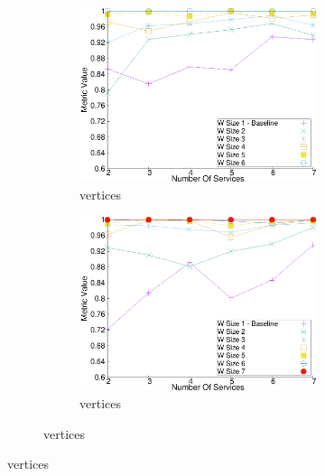 \begin{figure}[H]
\begin{adjustbox}{minipage=\linewidth,scale=0.75}
\begin{subfigure}{0.45\textwidth}
          \begin{subfigure}{\textwidth}
            \includegraphics[width=\textwidth]{Images/graphs/window_quality_performance_diff_perce_n7_s7_50_89_n6}
            \caption{ vertices}
            \label{fig:quality_window_average_perce_n6}
          \end{subfigure}


          \begin{subfigure}{\textwidth}
            \includegraphics[width=\textwidth]{Images/graphs/window_quality_performance_diff_perce_n7_s7_50_89_n7}
            \caption{ vertices}
            \label{fig:quality_window_average_perce_n7}
          \end{subfigure}


\end{subfigure}
\end{adjustbox}
\end{figure}
